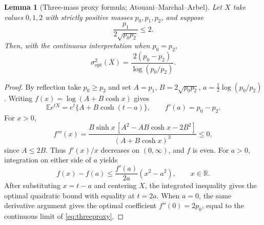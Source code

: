\documentclass[11pt,a4paper]{article}
\newtheorem{lemma}[theorem]{Lemma}
\newcommand{\E}{\mathbb E}\newcommand{\R}{\mathbb R}\newcommand{\N}{\mathbb N}\newcommand{\one}{\mathbf1}
\begin{document}
\begin{lemma}[Three-mass proxy formula; Atouani--Marchal--Arbel]\label{lem:threemass}
Let $X$ take values $0,1,2$ with strictly positive masses $p_0,p_1,p_2$, and suppose
\[
 \frac{p_1}{2\sqrt{p_0p_2}}\le2.
\]
Then, with the continuous interpretation when $p_0=p_2$,
\begin{equation}\label{eq:threeproxy}
 \sigma^2_{\mathrm{opt}}(X)=\frac{2(p_0-p_2)}{\log(p_0/p_2)}.
\end{equation}
\end{lemma}
\begin{proof}
By reflection take $p_0\ge p_2$ and set $A=p_1$, $B=2\sqrt{p_0p_2}$, $a=\frac12\log(p_0/p_2)$. Writing $f(x)=\log(A+B\cosh x)$ gives
\[
 \E e^{tX}=e^t\{A+B\cosh(t-a)\},\qquad
 f'(a)=p_0-p_2.
\]
For $x>0$,
\[
 f'''(x)=\frac{B\sinh x\,[A^2-AB\cosh x-2B^2]}{(A+B\cosh x)^3}\le0,
\]
since $A\le2B$. Thus $f'(x)/x$ decreases on $(0,\infty)$, and $f$ is even. For $a>0$, integration on either side of $a$ yields
\[
 f(x)-f(a)\le\frac{f'(a)}{2a}(x^2-a^2),\qquad x\in\mathbb R.
\]
After substituting $x=t-a$ and centering $X$, the integrated inequality gives the optimal quadratic bound with equality at $t=2a$. When $a=0$, the same derivative argument gives the optimal coefficient $f''(0)=2p_0$, equal to the continuous limit of \eqref{eq:threeproxy}.
\end{proof}
\end{document}
